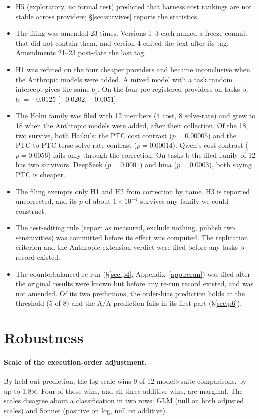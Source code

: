 \documentclass[10pt]{article}
\begin{document}
\begin{appendices}
\begin{itemize}
\item H5 (exploratory, no formal test) predicted that harness cost rankings are not stable across
providers; \S\ref{sec:survives} reports the statistics.
\item The filing was amended 23 times. Versions 1--3 each named a freeze commit that did not contain
them, and version 4 edited the text after its tag. Amendments 21--23 post-date the last tag.
\item H1 was refuted on the four cheaper providers and became inconclusive when the Anthropic models
were added. A mixed model with a task random intercept gives the same $b_1$. On the four
pre-registered providers on tasks-b, $b_1 = -0.0125$ [$-0.0202$, $-0.0051$].
\item The Holm family was filed with 12 members (4 cost, 8 solve-rate) and grew to 18 when the
Anthropic models were added, after their collection. Of the 18, two survive, both Haiku's: the PTC
cost contrast ($p = 0.00005$) and the PTC-to-PTC-terse solve-rate contrast ($p = 0.00014$). Qwen's
cost contrast ($p = 0.0056$) fails only through the correction. On tasks-b the filed family of 12
has two survivors, DeepSeek ($p = 0.0001$) and luna ($p = 0.0003$), both saying PTC is cheaper.
\item The filing exempts only H1 and H2 from correction by name. H3 is reported uncorrected, and its
$p$ of about $1\times10^{-4}$ survives any family we could construct.
\item The test-editing rule (report as measured, exclude nothing, publish two sensitivities) was
committed before its effect was computed. The replication criterion and the Anthropic extension
verdict were filed before any tasks-b record existed.
\item The counterbalanced re-run (\S\ref{sec:p4}, Appendix~\ref{app:rerun}) was filed after the
original results were known but before any re-run record existed, and was not amended. Of its two
predictions, the order-bias prediction holds at the threshold (5 of 8) and the A/A prediction fails
in its first part (\S\ref{sec:p6}).
\end{itemize}

\section{Robustness}\label{app:robust}

\paragraph{Scale of the execution-order adjustment.} By held-out prediction, the log scale wins 9 of 12
model$\times$suite comparisons, by up to 1.8$\times$. Four of those wins, and all three additive wins,
are marginal. The scales disagree about a classification in two rows: GLM (null on both adjusted
scales) and Sonnet (positive on log, null on additive).


\end{appendices}
\end{document}
